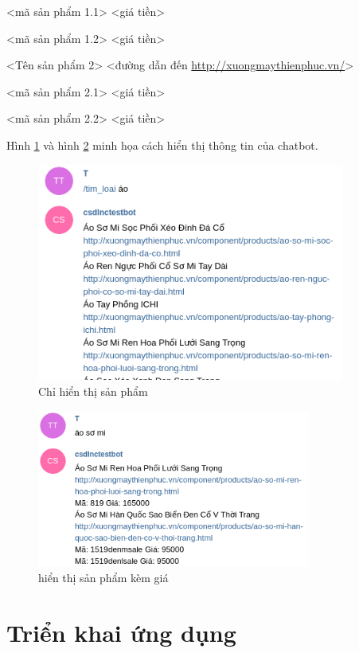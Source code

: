 <mã sản phẩm 1.1> <giá tiền> 

<mã sản phẩm 1.2> <giá tiền> 

<Tên sản phẩm 2> <đường dẫn đến \url{http://xuongmaythienphuc.vn/}> 

<mã sản phẩm 2.1> <giá tiền> 

<mã sản phẩm 2.2> <giá tiền> 

Hình \ref{fig:displayproduct} và hình \ref{fig:displayproductitem} minh họa cách hiển thị thông tin của chatbot. 

\begin{figure}[H]
\centering
\includegraphics[width=0.9\textwidth]{imagev2/displayproduct.png}
\caption{\label{fig:displayproduct} Chỉ hiển thị sản phẩm}
\end{figure}

\begin{figure}[H]
\centering
\includegraphics[width=0.8\textwidth]{imagev2/displayproductitem.png}
\caption{\label{fig:displayproductitem} hiển thị sản phẩm kèm giá }
\end{figure}

\section{Triển khai ứng dụng}


